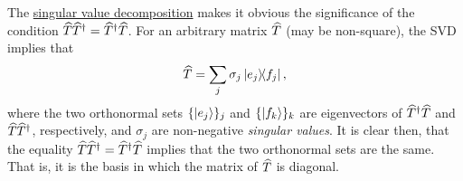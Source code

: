The \href{https://en.wikipedia.org/wiki/Singular_value_decomposition (SVD)}{singular value decomposition} makes it obvious the significance of the condition $\widehat{T}\widehat{T}^{\dagger} = \widehat{T}^{\dagger} \widehat{T}$. For an arbitrary matrix $\widehat{T}$ (may be non-square), the SVD implies that
\begin{align}
	\op T = \sum_{j} \sigma_j \dyad{e_j}{f_j},
\end{align}
where the two orthonormal sets $\{\ket{e_j}\}_j$ and $\{\ket{f_k}\}_k$ are eigenvectors of $\widehat{T}^{\dagger} \widehat{T}$ and $\widehat{T} \widehat{T}^{\dagger}$, respectively, and $\sigma_j$ are non-negative \emph{singular values}. It is clear then, that the equality $\widehat{T}\widehat{T}^{\dagger} = \widehat{T}^{\dagger}\widehat{T}$ implies that the two orthonormal sets are the same. That is, it is the basis in which the matrix of $\widehat{T}$ is diagonal.